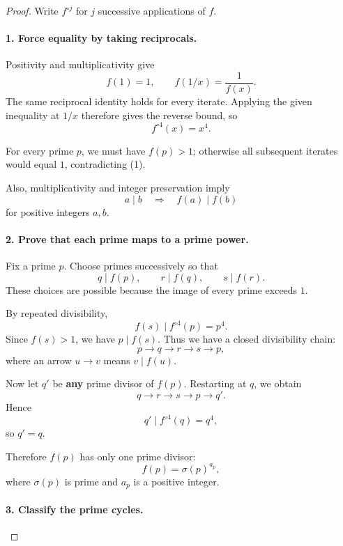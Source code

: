 
\begin{dlsummary}[title={\bfseries Solution 58. The Four-Step Prime Labyrinth},breakable]

\begin{proof}
Write \(f^{\circ j}\) for \(j\) successive applications of \(f\).

\paragraph{1. Force equality by taking reciprocals.}

Positivity and multiplicativity give
\[
f(1)=1,\qquad f(1/x)=\frac1{f(x)}.
\]
The same reciprocal identity holds for every iterate. Applying the given inequality at \(1/x\) therefore gives the reverse bound, so
\[
\boxed{f^{\circ4}(x)=x^4.} \tag{1}
\]

For every prime \(p\), we must have \(f(p)>1\); otherwise all subsequent iterates would equal \(1\), contradicting (1).

Also, multiplicativity and integer preservation imply
\[
a\mid b\quad\Longrightarrow\quad f(a)\mid f(b)
\]
for positive integers \(a,b\).

\paragraph{2. Prove that each prime maps to a prime power.}

Fix a prime \(p\). Choose primes successively so that
\[
q\mid f(p),\qquad r\mid f(q),\qquad s\mid f(r).
\]
These choices are possible because the image of every prime exceeds \(1\).

By repeated divisibility,
\[
f(s)\mid f^{\circ4}(p)=p^4.
\]
Since \(f(s)>1\), we have \(p\mid f(s)\). Thus we have a closed divisibility chain:
\[
p\longrightarrow q\longrightarrow r\longrightarrow s\longrightarrow p,
\]
where an arrow \(u\longrightarrow v\) means \(v\mid f(u)\).

Now let \(q'\) be \textbf{any} prime divisor of \(f(p)\). Restarting at \(q\), we obtain
\[
q\longrightarrow r\longrightarrow s\longrightarrow p\longrightarrow q'.
\]
Hence
\[
q'\mid f^{\circ4}(q)=q^4,
\]
so \(q'=q\).

Therefore \(f(p)\) has only one prime divisor:
\[
\boxed{f(p)=\sigma(p)^{a_p},}
\]
where \(\sigma(p)\) is prime and \(a_p\) is a positive integer.

\paragraph{3. Classify the prime cycles.}


\end{proof}
\end{dlsummary}
